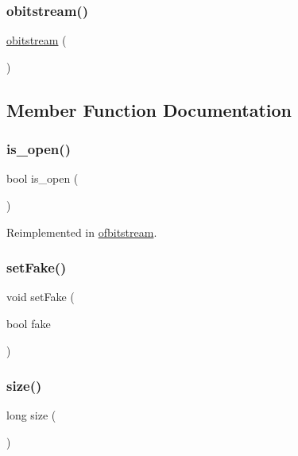\subsubsection{\texorpdfstring{obitstream()}{obitstream()}}
{\footnotesize\ttfamily \mbox{\hyperlink{classobitstream}{obitstream}} (\begin{DoxyParamCaption}{ }\end{DoxyParamCaption})}



\subsection{Member Function Documentation}
\mbox{\label{classobitstream_a2f57f54d8c03b615bb31eee091d8a88a}} 
\subsubsection{\texorpdfstring{is\+\_\+open()}{is\_open()}}
{\footnotesize\ttfamily bool is\+\_\+open (\begin{DoxyParamCaption}{ }\end{DoxyParamCaption})\hspace{0.3cm}{\ttfamily [virtual]}}



Reimplemented in \mbox{\hyperlink{classofbitstream_a2f57f54d8c03b615bb31eee091d8a88a}{ofbitstream}}.

\mbox{\label{classobitstream_ad916b4624eb09d375514964f867b475c}} 
\subsubsection{\texorpdfstring{set\+Fake()}{setFake()}}
{\footnotesize\ttfamily void set\+Fake (\begin{DoxyParamCaption}\item[{bool}]{fake }\end{DoxyParamCaption})}

\mbox{\label{classobitstream_a22727e9c338fb1aaa6722031445373c3}} 
\subsubsection{\texorpdfstring{size()}{size()}}
{\footnotesize\ttfamily long size (\begin{DoxyParamCaption}{ }\end{DoxyParamCaption})}

